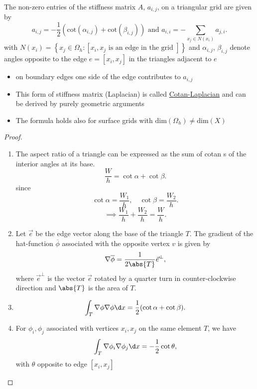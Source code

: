 \begin{lemma}
\label{thm:stiffnessmatrixlemma}
	The non-zero entries of the stiffness matrix $A$, $a_{i,j}$, on a triangular grid are given by
	\[
		a_{i,j} = -\frac{1}{2}(\text{cot}(\alpha_{i,j}) + \text{cot}(\beta_{i,j})) \text{ and } a_{i,i} = -\sum_{x_{j}\in N(x_{i})}^{}{a_{j,i}}
	.\] 
	with $N(x_{i})=\left\{ x_{j} \in \Omega _{h} : \left[ x_{i},x_{j} \text{ is an edge in the grid } \right]  \right\} $ and $\alpha_{i,j}$, $\beta_{i,j}$ denote angles opposite to the edge $e=[x_{i}, x_{j}]$ in the triangles adjacent to $e$


	\begin{itemize}[label=\underline{Note}: ]
	\item 
	on boundary edges one side of the edge contributes to $a_{i,j}$

	\item This form of stiffness matrix (Laplacian) is called \underline{Cotan-Laplacian} and can be derived by purely geometric arguments

	\item The formula holds also for surface grids with $\text{dim}(\Omega _{h}) \neq \text{dim}(X)$
\end{itemize}

\end{lemma}

\begin{proof}
\label{thm:stiffnessmatrixlemmaproof}
\begin{enumerate}[label=\arabic{enumi})]
	\item The aspect ratio of a triangle can be expressed as the sum of cotan s of the interior angles at its base.
		\[
		\frac{W}{h} = \cot \alpha + \cot \beta
		.\] 
		since
		\[
			\cot \alpha = \frac{W_{1}}{h},\quad \cot \beta = \frac{W_2}{h}
		.\] 
		\[
		\implies \frac{W_1}{h} + \frac{W_2}{h} = \frac{W}{h}
		.\] 
	\item Let $\vec{e}$ be the edge vector along the base of the triangle $T$. The gradient of the hat-function $\overline{\phi }$ associated with the opposite vertex $v$ is given by
		\[
		\nabla \overline{\phi } = \frac{1}{2\abs{T} }\vec{e}^{\bot}
		,\] 
		where $\vec{e}^{\bot}$ is the vector $\vec{e}$ rotated by a quarter turn in counter-clockwise direction and $\abs{T} $ is the area of $T$.
	\item 
		\[
			\int_{T}\nabla \phi \nabla \phi \d x = \frac{1}{2}(\cot \alpha + \cot \beta)
		.\] 
	\item For $\phi _{i}, \phi _{j}$ associated with vertices $x_{i}, x_{j}$ on the same element $T$, we have
		\[
		\int_{T}\nabla  \phi _{i} \nabla \phi _{j} \d x = - \frac{1}{2}\cot \theta
		,\] 
		with $\theta$ opposite to edge $[x_{i}, x_{j}]$
\end{enumerate}
\end{proof}

